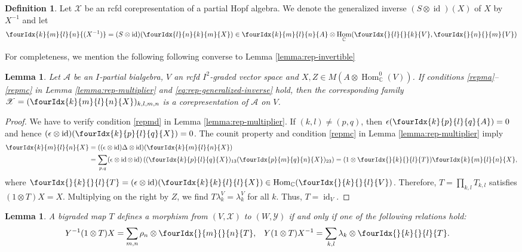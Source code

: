 \documentclass[10pt]{article}
\DeclareMathOperator{\id}{id}
\DeclareMathOperator{\Hom}{Hom}
\newcommand{\C}{\mathbb{C}}
\newcommand{\Gr}[5]{\fourIdx{#2}{#4}{#3}{#5}{#1}}%
\newcommand{\Gru}[3]{\Gr{#1}{}{}{#2}{#3}}
\newtheorem{Lem}[Theorem]{Lemma}
\theoremstyle{definition}
\newtheorem{Def}[Theorem]{Definition}
\numberwithin{equation}{section}
\begin{document}
\begin{Def}
  Let $\mathscr{X}$ be an rcfd corepresentation of a  partial Hopf
  algebra.  We  denote the generalized inverse $(S \otimes \id)(X)$
  of $X$  by $X^{-1}$ and let
  \begin{align*}
   \Gr{(X^{-1})}{k}{l}{m}{n}=(S \otimes \id)(\Gr{X}{l}{k}{n}{m}) \in
   \Gr{A}{k}{l}{m}{n} \otimes \Hom_{\C}(\Gru{V}{l}{k},\Gru{V}{n}{m})
  \end{align*}
\end{Def}
For completeness, we mention the following following converse to Lemma \ref{lemma:rep-invertible}
\begin{Lem}
  Let $\mathscr{A}$ be an $I$-partial bialgebra, $V$ an rcfd $I^{2}$-graded vector space and $X,Z \in M(A \otimes
  \Hom_{\C}^{0}(V))$. If conditions \ref{repma}--\ref{repmc} in Lemma
  \ref{lemma:rep-multiplier} and
  \eqref{eq:rep-generalized-inverse} hold, then the corresponding
  family $\mathscr{X}=(\Gr{X}{k}{l}{m}{n})_{k,l,m,n}$ is a
  corepresentation of $\mathscr{A}$ on $V$.
\end{Lem}
\begin{proof}
  We have to verify condition \ref{repmd} in Lemma
  \ref{lemma:rep-multiplier}.  If $(k,l) \neq (p,q)$, then
  $\epsilon(\Gr{A}{k}{l}{p}{q})=0$ and hence $(\epsilon
  \otimes \id)(\Gr{X}{k}{l}{p}{q}) =0$. The counit property and condition
  \ref{repmc} in Lemma \ref{lemma:rep-multiplier} imply 
\begin{align*}
  \Gr{X}{k}{l}{m}{n} &= ((\epsilon\otimes \id)  \Delta \otimes
  \id)(  \Gr{X}{k}{l}{m}{n}) 
\\ &  = \sum_{p,q} (\epsilon\otimes \id \otimes
  \id)\left((\Gr{X}{k}{l}{p}{q})_{13}(\Gr{X}{p}{q}{m}{n})_{23}\right)
  =  (1 \otimes \Gru{T}{k}{l})\Gr{X}{k}{l}{m}{n},
\end{align*}
where $\Gru{T}{k}{l}=(\epsilon \otimes \id)(\Gr{X}{k}{l}{k}{l}) \in
\Hom_{\C}(\Gru{V}{k}{l})$.  Therefore,  $T=\prod_{k,l} T_{k,l}$  satisfies $(1 \otimes T)X =
X$. Multiplying on the right by $Z$, we find
$T\lambda^{V}_{k}=\lambda^{V}_{k}$ for all $k$. Thus, $T=\id_{V}$.
\end{proof}

\begin{Lem} \label{lemma:rep-total-morphism}
 A bigraded map $T$ defines a morphism from 
    $(V,\mathscr{X})$ to $(W,\mathscr{Y})$ if and only if one of the following relations hold:
    \begin{align*}
      Y^{-1}(1 \otimes T)X&=\sum_{m,n} \rho_{n} \otimes \Gru{T}{m}{n},
      &
    Y(1\otimes T)X^{-1} &=\sum_{k,l} \lambda_{k} \otimes \Gru{T}{k}{l}.
    \end{align*}
\end{Lem}
\end{document}
